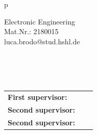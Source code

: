 \begin{center}
\begin{tabular}{p{\textwidth}}
\begin{center}
Electronic Engineering\\
Mat.Nr.: 2180015\\
luca.brodo@stud.hshl.de\\
\vspace{0.5cm}
\large{\mydate}


\end{center}

\\
\\
\\

\begin{center}
\begin{tabular}{lll}
\textbf{First supervisor:} & & \firstexaminer\\
\textbf{Second supervisor:} & & \secondexaminer\\
\textbf{Second supervisor:} & & \thirdexaminer\\
\end{tabular}
\end{center}

\end{tabular}
\end{center}